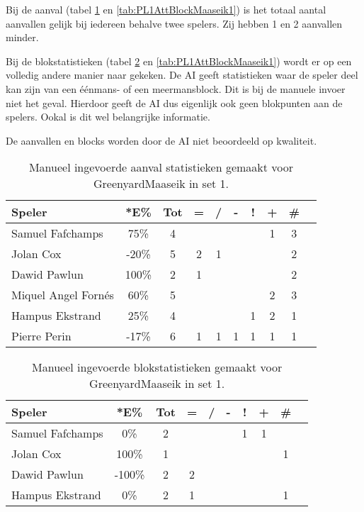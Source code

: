 Bij de aanval (tabel \ref{tab:PL1AttMaaseikMan1} en \ref{tab:PL1AttBlockMaaseik1}) is het totaal aantal aanvallen gelijk bij iedereen behalve twee spelers. Zij hebben 1 en 2 aanvallen minder.

Bij de blokstatistieken (tabel \ref{tab:PL1BlockMaaseikMan1} en \ref{tab:PL1AttBlockMaaseik1}) wordt er op een volledig andere manier naar gekeken. De AI geeft statistieken waar de speler deel kan zijn van een éénmans- of een meermansblock. Dit is bij de manuele invoer niet het geval. Hierdoor geeft de AI dus eigenlijk ook geen blokpunten aan de spelers. Ookal is dit wel belangrijke informatie.

De aanvallen en blocks worden door de AI niet beoordeeld op kwaliteit.

\begin{table}[ht!]
    \centering
    \scriptsize
    \begin{tabular}{|l|c|c|c|c|c|c|c|c|c|} \hline
        \textbf{Speler} & *E\% & Tot & = & / & - & ! & + & \# \\ \hline
        Samuel Fafchamps & 75\% & 4 &  &  &  &  & 1 & 3 \\ 
        Jolan Cox & -20\% & 5 & 2 & 1 &  &  &  & 2 \\ 
        Dawid Pawlun  & 100\% & 2 & 1 &  &  &  &  & 2 \\ 
        Miquel Angel Fornés & 60\% & 5 &  &  &  &  & 2 & 3 \\
        Hampus Ekstrand & 25\% & 4 &  &  &  & 1 & 2 & 1 \\ 
        Pierre Perin & -17\% & 6 & 1 & 1 & 1 & 1 & 1 & 1 \\ \hline
    \end{tabular}
    \caption[Manueel ingevoerde aanvalsstatistieken gemaakt Greenyard Maaseik in set 1]{\label{tab:PL1AttMaaseikMan1}Manueel ingevoerde aanval statistieken gemaakt voor GreenyardMaaseik in set 1.}
\end{table}

\begin{table}[ht!]
    \centering
    \scriptsize
    \begin{tabular}{|l|c|c|c|c|c|c|c|c|c|} \hline
        \textbf{Speler} & *E\% & Tot & = & / & - & ! & + & \# \\ \hline
        Samuel Fafchamps & 0\% & 2 &  &  &  & 1 & 1 &  \\ 
        Jolan Cox & 100\% & 1 &  &  &  &  &  & 1 \\ 
        Dawid Pawlun & -100\% & 2 & 2 &  &  &  &  &  \\ 
        Hampus Ekstrand & 0\% & 2 & 1 &  &  &  &  & 1 \\ \hline
    \end{tabular}
    \caption[Manueel ingevoerde blokstatistieken gemaakt Greenyard Maaseik in set 1]{\label{tab:PL1BlockMaaseikMan1}Manueel ingevoerde blokstatistieken gemaakt voor GreenyardMaaseik in set 1.}
\end{table}

